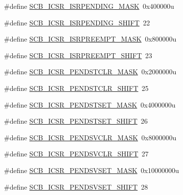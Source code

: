 \begin{DoxyCompactItemize}
\item 
\#define \hyperlink{group___s_c_b___register___masks_gaccd41792c40fc7ab2b03678da539ad65}{S\+C\+B\+\_\+\+I\+C\+S\+R\+\_\+\+I\+S\+R\+P\+E\+N\+D\+I\+N\+G\+\_\+\+M\+A\+SK}~0x400000u
\item 
\#define \hyperlink{group___s_c_b___register___masks_ga22f457e32a8d6a617ff90bdfb7b874de}{S\+C\+B\+\_\+\+I\+C\+S\+R\+\_\+\+I\+S\+R\+P\+E\+N\+D\+I\+N\+G\+\_\+\+S\+H\+I\+FT}~22
\item 
\#define \hyperlink{group___s_c_b___register___masks_ga5ecbf8248ffbd07923fc188497a5a931}{S\+C\+B\+\_\+\+I\+C\+S\+R\+\_\+\+I\+S\+R\+P\+R\+E\+E\+M\+P\+T\+\_\+\+M\+A\+SK}~0x800000u
\item 
\#define \hyperlink{group___s_c_b___register___masks_gafc9c373a4862603c06eaade5503d9fc7}{S\+C\+B\+\_\+\+I\+C\+S\+R\+\_\+\+I\+S\+R\+P\+R\+E\+E\+M\+P\+T\+\_\+\+S\+H\+I\+FT}~23
\item 
\#define \hyperlink{group___s_c_b___register___masks_ga7dc9d2d6061166d9cfa66904477acd2e}{S\+C\+B\+\_\+\+I\+C\+S\+R\+\_\+\+P\+E\+N\+D\+S\+T\+C\+L\+R\+\_\+\+M\+A\+SK}~0x2000000u
\item 
\#define \hyperlink{group___s_c_b___register___masks_ga4681662981a7a9ce4c39ba42e79bdf36}{S\+C\+B\+\_\+\+I\+C\+S\+R\+\_\+\+P\+E\+N\+D\+S\+T\+C\+L\+R\+\_\+\+S\+H\+I\+FT}~25
\item 
\#define \hyperlink{group___s_c_b___register___masks_gaec656bf7e4d2fdcacfe0ef3e16397a04}{S\+C\+B\+\_\+\+I\+C\+S\+R\+\_\+\+P\+E\+N\+D\+S\+T\+S\+E\+T\+\_\+\+M\+A\+SK}~0x4000000u
\item 
\#define \hyperlink{group___s_c_b___register___masks_ga048d1683c88c61f80f5c80173bf5e981}{S\+C\+B\+\_\+\+I\+C\+S\+R\+\_\+\+P\+E\+N\+D\+S\+T\+S\+E\+T\+\_\+\+S\+H\+I\+FT}~26
\item 
\#define \hyperlink{group___s_c_b___register___masks_ga12a45a6af09cbefd431d033d8411220e}{S\+C\+B\+\_\+\+I\+C\+S\+R\+\_\+\+P\+E\+N\+D\+S\+V\+C\+L\+R\+\_\+\+M\+A\+SK}~0x8000000u
\item 
\#define \hyperlink{group___s_c_b___register___masks_gad7a5894ad98606b443ab6f1b52f2bc36}{S\+C\+B\+\_\+\+I\+C\+S\+R\+\_\+\+P\+E\+N\+D\+S\+V\+C\+L\+R\+\_\+\+S\+H\+I\+FT}~27
\item 
\#define \hyperlink{group___s_c_b___register___masks_ga5ed59a5d03a7d25ef76aa9d92e25e4a5}{S\+C\+B\+\_\+\+I\+C\+S\+R\+\_\+\+P\+E\+N\+D\+S\+V\+S\+E\+T\+\_\+\+M\+A\+SK}~0x10000000u
\item 
\#define \hyperlink{group___s_c_b___register___masks_ga76cddcbf872958b00237c662309251d2}{S\+C\+B\+\_\+\+I\+C\+S\+R\+\_\+\+P\+E\+N\+D\+S\+V\+S\+E\+T\+\_\+\+S\+H\+I\+FT}~28

\end{DoxyCompactItemize}
